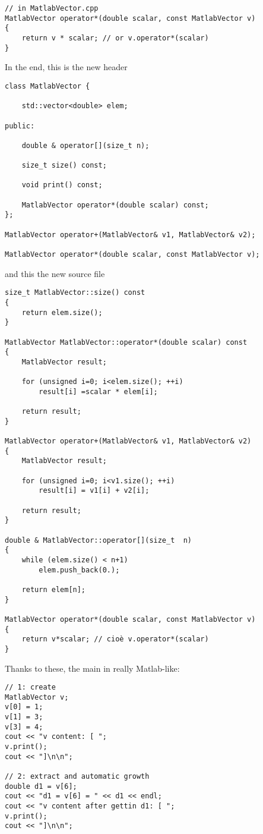 \begin{enumerate}[$\triangleright$]
\begin{lstlisting}
// in MatlabVector.cpp
MatlabVector operator*(double scalar, const MatlabVector v) 
{
    return v * scalar; // or v.operator*(scalar)
}
\end{lstlisting} 

In the end, this is the new header
\begin{lstlisting}
class MatlabVector {

    std::vector<double> elem;

public:

    double & operator[](size_t n);

    size_t size() const;

    void print() const;

    MatlabVector operator*(double scalar) const;
};

MatlabVector operator+(MatlabVector& v1, MatlabVector& v2);

MatlabVector operator*(double scalar, const MatlabVector v);
\end{lstlisting}

and this the new source file
\begin{lstlisting}
size_t MatlabVector::size() const
{
    return elem.size();
}

MatlabVector MatlabVector::operator*(double scalar) const
{
    MatlabVector result;

    for (unsigned i=0; i<elem.size(); ++i)
        result[i] =scalar * elem[i];

    return result;
}

MatlabVector operator+(MatlabVector& v1, MatlabVector& v2)
{
    MatlabVector result;

    for (unsigned i=0; i<v1.size(); ++i)
        result[i] = v1[i] + v2[i];

    return result;
}

double & MatlabVector::operator[](size_t  n)
{
    while (elem.size() < n+1)
        elem.push_back(0.);

    return elem[n];
}

MatlabVector operator*(double scalar, const MatlabVector v)
{
    return v*scalar; // cioè v.operator*(scalar)
}
\end{lstlisting}

Thanks to these, the main in really Matlab-like:
\begin{lstlisting}
// 1: create
MatlabVector v;
v[0] = 1;
v[1] = 3;
v[3] = 4;
cout << "v content: [ ";
v.print();
cout << "]\n\n";

// 2: extract and automatic growth
double d1 = v[6];
cout << "d1 = v[6] = " << d1 << endl;
cout << "v content after gettin d1: [ ";
v.print();
cout << "]\n\n";


\end{lstlisting}
\end{enumerate}
